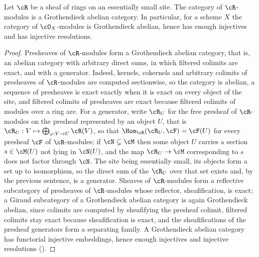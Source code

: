 \begin{lemma}
\label{lem:pc-sheaves-of-modules-grothendieck}
Let $\cR$ be a sheaf of rings on an essentially small site.  The category of $\cR$-modules is a
Grothendieck abelian category.  In particular, for a scheme $X$ the category of
$\cO_X$-modules is Grothendieck abelian, hence has enough injectives and has injective
resolutions.
\leanok
{}
\end{lemma}
\begin{proof}
Presheaves of $\cR$-modules form a Grothendieck abelian category, that is, an abelian
category with arbitrary direct sums, in which filtered colimits are exact, and with a
generator.  Indeed, kernels, cokernels and arbitrary colimits of presheaves of
$\cR$-modules are computed sectionwise, so the category is abelian, a sequence of
presheaves is exact exactly when it is exact on every object of the site, and filtered
colimits of presheaves are exact because filtered colimits of modules over a ring are.
For a generator, write $\cR_U$ for the free presheaf of $\cR$-modules on the presheaf
represented by an object $U$, that is $\cR_U:V\mapsto\bigoplus_{\varphi:V\to U}\cR(V)$,
so that $\Hom_{\cR}(\cR_U,\cF)=\cF(U)$ for every presheaf $\cF$ of $\cR$-modules; if
$\cN\subsetneq\cM$ then some object $U$ carries a section $s\in\cM(U)$ not lying in
$\cN(U)$, and the map $\cR_U\to\cM$ corresponding to $s$ does not factor through $\cN$.
The site being essentially small, its objects form a set up to isomorphism, so the direct
sum of the $\cR_U$ over that set exists and, by the previous sentence, is a generator.
Sheaves of $\cR$-modules form a reflective subcategory of presheaves of
$\cR$-modules whose reflector, sheafification, is exact; a Giraud subcategory of a Grothendieck
abelian category is again Grothendieck abelian, since colimits are computed by sheafifying the
presheaf colimit, filtered colimits stay exact because sheafification is exact, and the
sheafifications of the presheaf generators form a separating family.  A Grothendieck abelian
category has functorial injective embeddings, hence enough injectives and injective
resolutions ().
\end{proof}

